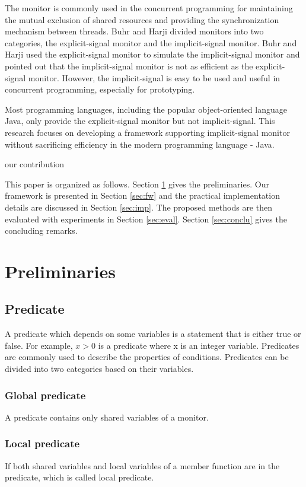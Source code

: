 \documentclass[preprint]{sigplanconf}
\begin{document}
The monitor \cite{hoa74} is commonly used in the concurrent programming for 
maintaining the mutual exclusion of shared resources and providing the 
synchronization mechanism between threads. Buhr and Harji \cite{bh05} divided 
monitors into two categories, the explicit-signal monitor and the 
implicit-signal monitor. Buhr and Harji used the explicit-signal monitor to 
simulate the implicit-signal monitor and pointed out that the implicit-signal 
monitor is not as efficient as the explicit-signal monitor. However, the 
implicit-signal is easy to be used and useful in concurrent programming,
especially for prototyping. 

Most programming languages, including the popular object-oriented language Java,
only provide the explicit-signal monitor but not implicit-signal. This research 
focuses on developing a framework supporting implicit-signal monitor without
sacrificing efficiency in the modern programming language - Java. 

our contribution

This paper is organized as follows. Section \ref{sec:pre} gives the
preliminaries. 
Our framework is presented in Section \ref{sec:fw} and the practical 
implementation details are discussed in Section \ref{sec:imp}. The proposed 
methods are then evaluated with experiments in Section \ref{sec:eval}. 
Section \ref{sec:conclu} gives the concluding remarks.

\section{Preliminaries} \label{sec:pre}
\subsection{Predicate}
A predicate which depends on some variables is a statement that is either true
or false. For example, $x > 0$ is a predicate where x is an integer variable. 
Predicates are commonly used to describe the properties of conditions. 
Predicates can be divided into two categories based on their variables.
\subsubsection{Global predicate} A predicate contains only shared variables of a
    monitor. 
\subsubsection{Local predicate} If both shared variables and local variables of a
    member function are in the predicate, which is called local predicate. 
\end{document}
